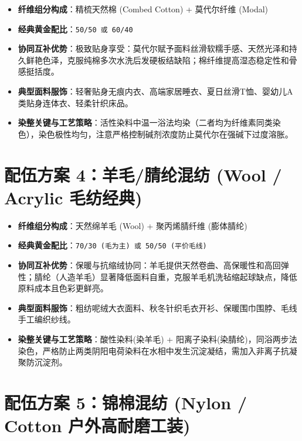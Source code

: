\documentclass[11pt,openright,twoside,UTF8]{ctexbook}
\begin{document}
\begin{itemize} \setlength{\itemsep}{2.5pt}
    \item \textbf{纤维组分构成}：精梳天然棉 (Combed Cotton) + 莫代尔纤维 (Modal)
    \item \textbf{经典黄金配比}：\texttt{50/50 或 60/40}
    \item \textbf{协同互补优势}：极致贴身享受：莫代尔赋予面料丝滑软糯手感、天然光泽和持久鲜艳色泽，克服纯棉多次水洗后发硬板结缺陷；棉纤维提高湿态稳定性和骨感挺括度。
    \item \textbf{典型面料服饰}：轻奢贴身无痕内衣、高端家居睡衣、夏日丝滑T恤、婴幼儿A类贴身连体衣、轻柔针织床品。
    \item \textbf{染整关键与工艺策略}：活性染料中温一浴法均染（二者均为纤维素同类染色），染色极性均匀，注意严格控制碱剂浓度防止莫代尔在强碱下过度溶胀。
\end{itemize}
\vspace{0.3cm}

\section{配伍方案 4：羊毛/腈纶混纺 (Wool / Acrylic 毛纺经典)}

\begin{itemize} \setlength{\itemsep}{2.5pt}
    \item \textbf{纤维组分构成}：天然绵羊毛 (Wool) + 聚丙烯腈纤维 (膨体腈纶)
    \item \textbf{经典黄金配比}：\texttt{70/30 (毛为主) 或 50/50 (平价毛线)}
    \item \textbf{协同互补优势}：保暖与抗缩绒协同：羊毛提供天然卷曲、高保暖性和高回弹性；腈纶（人造羊毛）显著降低面料自重，克服羊毛机洗毡缩起球缺点，降低原料成本且色彩更鲜亮。
    \item \textbf{典型面料服饰}：粗纺呢绒大衣面料、秋冬针织毛衣开衫、保暖围巾围脖、毛线手工编织纱线。
    \item \textbf{染整关键与工艺策略}：酸性染料(染羊毛) + 阳离子染料(染腈纶)，同浴两步法染色，严格防止两类阴阳电荷染料在水相中发生沉淀凝结，需加入非离子抗凝聚防沉淀剂。
\end{itemize}
\vspace{0.3cm}

\section{配伍方案 5：锦棉混纺 (Nylon / Cotton 户外高耐磨工装)}
\end{document}
